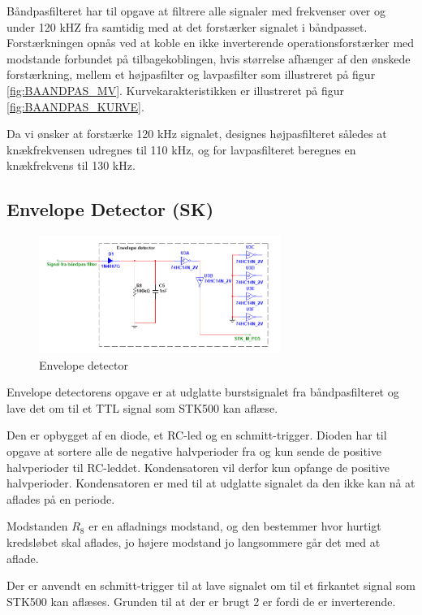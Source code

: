 Båndpasfilteret har til opgave at filtrere alle signaler med frekvenser over og under 120 kHZ fra samtidig med at det forstærker signalet i båndpasset. Forstærkningen opnås ved at koble en ikke inverterende operationsforstærker med modstande forbundet på tilbagekoblingen, hvis størrelse afhænger af den ønskede forstærkning, mellem et højpasfilter og lavpasfilter som illustreret på figur \ref{fig:BAANDPAS_MV}. Kurvekarakteristikken er illustreret på figur \ref{fig:BAANDPAS_KURVE}.

Da vi ønsker at forstærke 120 kHz signalet, designes højpasfilteret således at knækfrekvensen udregnes til 110 kHz, og for lavpasfilteret beregnes en knækfrekvens til 130 kHz.

\subsection{Envelope Detector (SK)}
\begin{figure}[htbp]
	\centering
	\includegraphics[width=0.70\textwidth]{billeder/HWdesign/ED_MV.png}
	\caption{Envelope detector}
	\label{fig:ED_MV}
\end{figure}

Envelope detectorens opgave er at udglatte burstsignalet fra båndpasfilteret og lave det om til et TTL signal som STK500 kan aflæse.

Den er opbygget af en diode, et RC-led og en schmitt-trigger. Dioden har til opgave at sortere alle de negative halvperioder fra og kun sende de positive halvperioder til RC-leddet. Kondensatoren vil derfor kun opfange de positive halvperioder. Kondensatoren er med til at udglatte signalet da den ikke kan nå at aflades på en periode.

Modstanden $R_8$ er en afladnings modstand, og den bestemmer hvor hurtigt kredsløbet skal aflades, jo højere modstand jo langsommere går det med at aflade.

Der er anvendt en schmitt-trigger til at lave signalet om til et firkantet signal som STK500 kan aflæses. Grunden til at der er brugt 2 er fordi de er inverterende.


